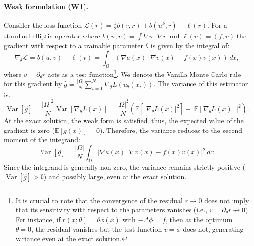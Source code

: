 \documentclass{article}
\theoremstyle{definition}
\begin{document}
\paragraph{Weak formulation (W1).}
Consider the loss function $\mathcal{L}(r) = \frac{1}{2}b(r,r) + b(u^k,r) - \ell(r)$. For a standard elliptic operator where $b(u,v)=\int \nabla u \cdot \nabla v $ and $\ell(v)=(f,v)$ the gradient with respect to a trainable parameter $\theta$ is given by the integral of:
\begin{equation}
    \nabla_\theta \mathcal{L} = b(u,v)-\ell(v) = \int_{\Omega} \left( \nabla u(x) \cdot \nabla v(x) - f(x)v(x) \right) \, dx,
\end{equation}
where $v = \partial_\theta r$ acts as a test function\footnote{It is crucial to note that the convergence of the residual $r \to 0$ does not imply that its sensitivity with respect to the parameters vanishes (i.e., $v = \partial_\theta r \not\to 0$). For instance, if $r(x; \theta) = \theta \phi(x)$ with $-\Delta \phi = f$, then at the optimum $\theta=0$, the residual vanishes but the test function $v=\phi$ does not, generating variance even at the exact solution.}. We denote the Vanilla Monte Carlo rule  for this gradient by $\hat{g} = \frac{|\Omega|}{N} \sum_{i=1}^N \nabla_\theta L(u_\theta(x_i))$. The variance of this estimator is:
\begin{equation}
    \operatorname{Var}[\hat{g}] = \frac{|\Omega|^2}{N} \operatorname{Var}[\nabla_\theta L(x)] = \frac{|\Omega|^2}{N} \left( \mathbb{E}[|\nabla_\theta L(x)|^2] - |\mathbb{E}[\nabla_\theta L(x)]|^2 \right).
\end{equation}
At the exact solution, the weak form is satisfied; thus, the expected value of the gradient is zero ($\mathbb{E}[g(x)] = 0$). Therefore, the variance reduces to the second moment of the integrand:
\begin{equation}
    \operatorname{Var}[\hat{g}] = \frac{|\Omega|}{N} \int_{\Omega} | \nabla u(x) \cdot \nabla v(x) - f(x)v(x) |^2 \, dx.
\end{equation}
Since the integrand is generally non-zero, the variance remains strictly positive ($\operatorname{Var}[\hat{g}] > 0$) and possibly large, even at the exact solution.
\end{document}

